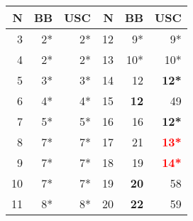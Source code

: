 \begin{tabular}{r|rr||r|rr}
 \hline
 N&BB &USC&N&BB&USC\\
 \hline
 3&2*&2*&12&9*&9*\\
 4&2*&2*&13&10*&10*\\
 5&3*&3*&14&12&\textbf{12*}\\
 6&4*&4*&15&\textbf{12}&49\\
 7&5*&5*&16&16&\textbf{12*}\\
 8&7*&7*&17&21&\textbf{\textcolor{red}{13*}}\\
 9&7*&7*&18&19&\textbf{\textcolor{red}{14*}}\\
 10&7*&7*&19&\textbf{20}&58\\
 11&8*&8*&20&\textbf{22}&59\\
\end{tabular}
